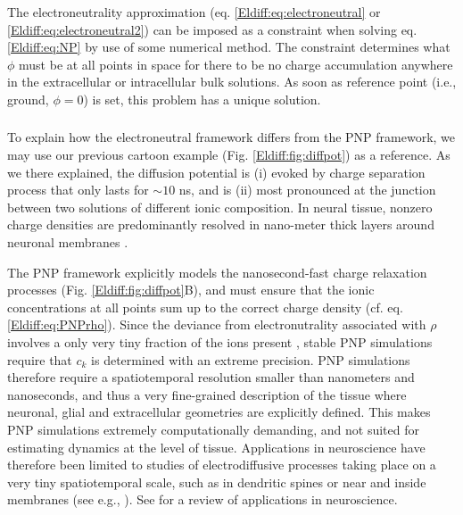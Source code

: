 The electroneutrality approximation (eq. \ref{Eldiff:eq:electroneutral} or \ref{Eldiff:eq:electroneutral2}) can be imposed as a constraint when solving eq.\ref{Eldiff:eq:NP} by use of some numerical method. The constraint determines what $\phi$ must be at all points in space for there to be no charge accumulation anywhere in the extracellular or intracellular bulk solutions. As soon as reference point (i.e., ground, $\phi = 0$) is set, this problem has a unique solution.


\subsubsection{}
\label{sec:Eldiff:CompareFrameworks}
To explain how the electroneutral framework differs from the PNP framework, we may use our previous cartoon example (Fig. \ref{Eldiff:fig:diffpot}) as a reference. As we there explained, the diffusion potential is (i) evoked by charge separation process that only lasts for $\sim 10$ ns, and is (ii) most pronounced at the junction between two solutions of different ionic composition. In neural tissue, nonzero charge densities are predominantly resolved in nano-meter thick layers around neuronal membranes \citep{Grodzinsky2011, Gratiy2017}. 

The PNP framework explicitly models the nanosecond-fast charge relaxation processes (Fig. \ref{Eldiff:fig:diffpot}B), and must ensure that the ionic concentrations at all points sum up to the correct charge density (cf. eq. \ref{Eldiff:eq:PNPrho}). Since the deviance from electronutrality associated with $\rho$ involves a only very tiny fraction of the ions present \citep{Aguilella1987}, stable PNP simulations require that $c_k$ is determined with an extreme precision. PNP simulations therefore require a spatiotemporal resolution smaller than nanometers and nanoseconds, and thus a very fine-grained description of the tissue where neuronal, glial and extracellular geometries are explicitly defined. This makes PNP simulations extremely computationally demanding, and not suited for estimating dynamics at the level of tissue. Applications in neuroscience have therefore been limited to studies of electrodiffusive processes taking place on a very tiny spatiotemporal scale, such as in dendritic spines or near and inside membranes (see e.g., \citep{Leonetti2004, Lu2007, Lopreore2008, Nanninga2008, Gardner2011, Zheng2011, Pods2013, Gardner2015, lagache2019, cartailler2019}). See \citep{Savtchenko2017} for a review of applications in neuroscience.

